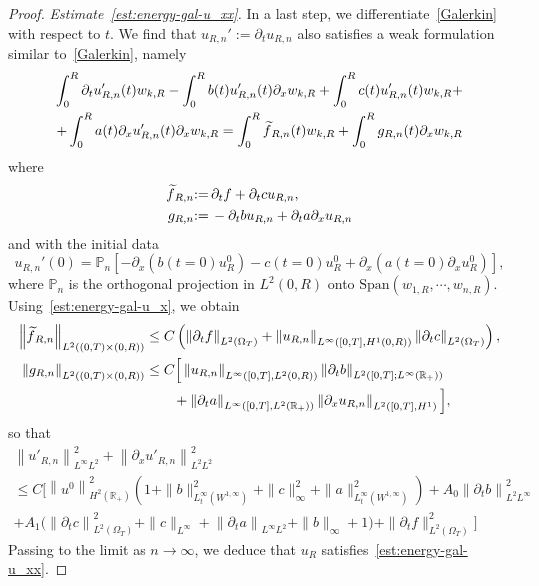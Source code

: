 \documentclass[10pt]{amsart}
\theoremstyle{definition}\newtheorem{defi}[theo]{Definition}\newtheorem{rema}[theo]{Remark}\newtheorem{exam}[theo]{Example}\newtheorem{exem}[theo]{Example}\newtheorem{nota}[theo]{Notation}
\newcommand{\R}{\mathbb{R}}
\newcommand{\p}{\partial}
\newcommand{\Span}{\mathrm{Span}}
\newcommand{\bbP}{\mathbb{P}}
\let\oldtilde\tilde
\renewcommand*{\tilde}[1]{\mathchoice{\widetilde{#1}}{\widetilde{#1}}{\oldtilde{#1}}{\oldtilde{#1}}}
\begin{document}
\begin{proof}
\emph{Estimate~\eqref{est:energy-gal-u_xx}.}
In a last step, we differentiate~\eqref{Galerkin} with respect to $t$. We find that $u_{R,n}':=\p_t u_{R,n}$ also satisfies a weak formulation similar to~\eqref{Galerkin}, namely
\begin{multline}\label{Galerkin-bis}
\int_0^R\p_t u_{R,n}'(t)w_{k,R} - \int_0^R b(t)u_{R,n}'(t) \p_x w_{k,R} + \int_0^R c(t)u_{R,n}'(t) w_{k,R}+\\ + \int_0^R a(t) \p_x u_{R,n}'(t) \p_x w_{k,R} =\int_0^R \tilde f_{R,n}(t) w_{k,R} + \int_0^R g_{R,n}(t) \p_x w_{k,R}
\end{multline}
where
\begin{align*}
\tilde f_{R,n} &{:=}\, \p_t f + \p_t c u_{R,n},\\
g_{R,n} &{:=}\,- \p_t b u_{R,n} + \p_t a \p_x u_{R,n}
\end{align*}
and with the initial data
\[
u_{R,n}'(0)=\bbP_n\left[-\p_x \left(b(t=0) u_{R}^0\right) - c(t=0) u_R^0 + \p_x \left(a(t=0) \p_x u_R^0\right)\right],
\]
where $\bbP_n$ is the orthogonal projection in $L^2(0,R)$ onto $\Span(w_{1,R}, \cdots, w_{n,R})$. Using~\eqref{est:energy-gal-u_x}, we obtain
\begin{align*}
\left\| \tilde f_{R,n}\right\|_{L^2\left((0,T)\times (0,R)\right)} & \leq C \left(\left\|\p_t f\right\|_{L^2(\Omega_T)} + \left\|u_{R,n}\right\|_{L^\infty\left([0,T], H^1(0,R)\right)} \left\|\p_t c\right\|_{L^2(\Omega_T)}\right),\\
\left\|g_{R,n}\right\|_{L^2\left((0,T)\times (0,R)\right)} & \leq C\Big[\left\|u_{R,n}\right\|_{L^\infty\left([0,T], L^2(0,R)\right)} \left\|\p_t b\right\|_{L^2\left([0,T];L^\infty(\R_+)\right)} \\
& \qquad + \left\|\p_t a\right\|_{L^\infty\left([0,T], L^2(\R_+)\right)}\left\|\p_x u_{R,n}\right\|_{L^2\left([0,T], H^1\right)}\Big],
\end{align*}
so that
\begin{multline*}
\left\|u'_{R,n}\right\|_{L^\infty L^2}^2 + 
\left\|\partial_x u'_{R,n}\right\|_{L^2L^2}^2 \\
 \leq C\Big[\left\|u^0\right\|_{H^2(\R_+)}^2 \left(1 + \| b\|_{L^\infty_t\left(W^{1,\infty}\right)}^2 + \|c\|_\infty^2 + \| a\|_{L^\infty_t\left(W^{1,\infty}\right)}^2\right)+ A_0\left\|\partial_t b\right\|_{L^2 L^\infty}^2\\
+ A_1\big(\left\|\partial_t c\right\|_{L^2(\Omega_T)}^2+ \|c\|_{L^\infty} + \left\|\partial_t a\right\|_{L^\infty L^2} + \|b\|_\infty+1\big) + \|\partial_t f\|_{L^2(\Omega_T)}^2 \Big]
\end{multline*}
Passing to the limit as $n\to \infty$, we deduce that $u_R$ satisfies~\eqref{est:energy-gal-u_xx}.




\end{proof}
\end{document}
